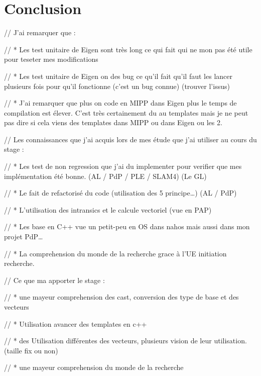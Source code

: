 \section{Conclusion}

// J'ai remarquer que :

// * Les test unitaire de Eigen sont très long ce qui fait qui ne mon pas été utile
pour teseter mes modifications

// * Les test unitaire de Eigen on des bug ce qu'il fait qu'il faut les lancer plusieurs
fois pour qu'il fonctionne (c'est un bug connue) (trouver l'issus)

// * J'ai remarquer que plus on code en MIPP dans Eigen plus le temps de compilation est
élever. C'est très certainement du au templates mais je ne peut pas dire si cela viens
des templates dans MIPP ou dans Eigen ou les 2.

// Les connaissances que j'ai acquis lors de mes étude que j'ai utiliser au cours du
stage :

// * Les test de non regression que j'ai du implementer pour verifier que mes
implémentation été bonne. (AL / PdP / PLE / SLAM4) (Le GL)

// * Le fait de refactorisé du code (utilisation des 5 principe\dots) (AL / PdP)

// * L'utilisation des intransics et le calcule vectoriel (vue en PAP)

// * Les base en C++ vue un petit-peu en OS dans nahos mais aussi dans mon projet PdP\dots

// * La comprehension du monde de la recherche grace à l'UE initiation recherche.

// Ce que ma apporter le stage :

// * une mayeur comprehension des cast, conversion des type de base et des vecteurs

// * Utilisation avancer des templates en c++

// * des Utilisation différentes des vecteurs, plusieurs vision de leur utilisation.
(taille fix ou non)

// * une mayeur comprehension du monde de la recherche

